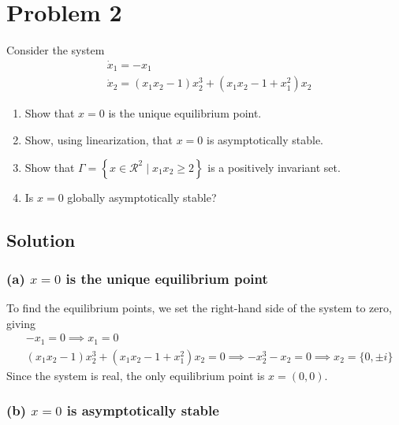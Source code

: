 \section*{Problem 2}

Consider the system
\begin{align*}
     &
    \dot{x}_{1}=-x_{1}
    \\ &
    \dot{x}_{2}=\left(x_{1} x_{2}-1\right) x_{2}^{3}+\left(x_{1} x_{2}-1+x_{1}^{2}\right) x_{2}
\end{align*}
\begin{enumerate}[label= (\alph*)]
    \item Show that \( x=0 \) is the unique equilibrium point.
    \item Show, using linearization, that \( x=0 \) is asymptotically stable.
    \item Show that \( \Gamma=\left \{ x \in \mathcal{R}^{2} \mid x_{1} x_{2} \geq 2\right \} \) is a positively invariant set.
    \item Is \( x=0 \) globally asymptotically stable?
\end{enumerate}

\subsection*{Solution}

\subsubsection*{(a) \( x=0 \) is the unique equilibrium point}

To find the equilibrium points, we set the right-hand side of the system to zero, giving
\begin{align*}
     &
    -x_1 = 0
    \implies
    x_1 = 0
    \\ &
    \left(x_{1} x_{2}-1\right) x_{2}^{3}+\left(x_{1} x_{2}-1+x_{1}^{2}\right) x_{2} = 0
    \implies
    - x_2^3 - x_2 = 0
    \implies
    x_2 = \{ 0, \pm i \}
\end{align*}
Since the system is real, the only equilibrium point is \( x = (0, 0) \).

\subsubsection*{(b) \( x=0 \) is asymptotically stable}

